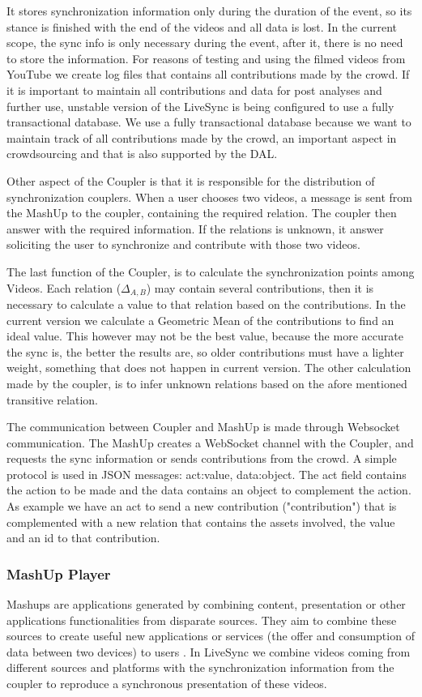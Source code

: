 \documentclass[jidm,a4paper]{jidm} %
\begin{document}
It stores synchronization information only during the duration of the event, so its stance is finished with the end of the videos and all data is lost. In the current scope, the sync info is only necessary during the event, after it, there is no need to store the information. For reasons of testing and using the filmed videos from YouTube we create log files that contains all contributions made by the crowd. If it is important to maintain all contributions and data for post analyses and further use, unstable version of the LiveSync is being configured to use a fully transactional database. We use a fully transactional database because we want to maintain track of all contributions made by the crowd, an important aspect in crowdsourcing and that is also supported by the DAL.

Other aspect of the Coupler is that it is responsible for the distribution of synchronization couplers. When a user chooses two videos, a message is sent from the MashUp to the coupler, containing the required relation. The coupler then answer with the required information. If the relations is unknown, it answer soliciting the user to synchronize and contribute with those two videos.

The last function of the Coupler, is to calculate the synchronization points among Videos. Each relation ($\Delta_{A,B}$) may contain several contributions, then it is necessary to calculate a value to that relation based on the contributions. In the current version we calculate a Geometric Mean of the contributions to find an ideal value. This however may not be the best value, because the more accurate the sync is, the better the results are, so older contributions must have a lighter weight, something that does not happen in current version. The other calculation made by the coupler, is to infer unknown relations based on the afore mentioned transitive relation.

The communication  between Coupler and MashUp is made through Websocket communication. The MashUp creates a WebSocket channel with the Coupler, and requests the sync information or sends contributions from the crowd. A simple protocol is used in JSON messages: {act:value, data:object}. The act field contains the action to be made and the data contains an object to complement the action. As example we have an act to send a new contribution ("contribution") that is complemented with a new relation that contains the assets involved, the value and an id to that contribution.

\subsubsection{MashUp Player}
Mashups are applications generated by combining content, presentation or other applications functionalities from disparate sources. They aim to combine these sources to create useful new applications or services (the offer and consumption of data between two devices) to users \cite{yu2008understanding}. In LiveSync we combine videos coming from different sources and platforms with the synchronization information from the coupler to reproduce a synchronous presentation of these videos.
\end{document}
